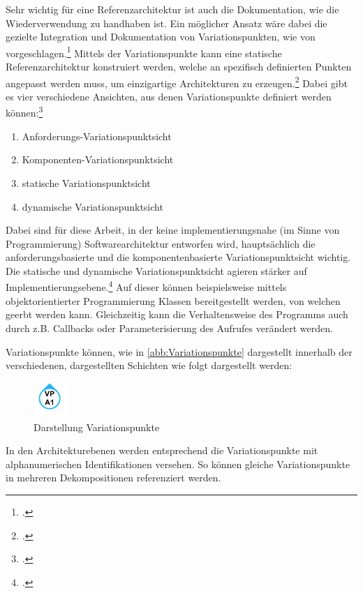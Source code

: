 Sehr wichtig für eine Referenzarchitektur ist auch die Dokumentation, wie die Wiederverwendung zu handhaben ist. Ein möglicher Ansatz wäre dabei die gezielte Integration und Dokumentation von Variationspunkten, wie von \citeauthor{Webber.2001} vorgeschlagen.\footcite[Vgl.][24\psqq]{Webber.2001} Mittels der Variationspunkte kann eine statische Referenzarchitektur konstruiert werden, welche an spezifisch definierten Punkten angepasst werden muss, um einzigartige Architekturen zu erzeugen.\footcite[Vgl.][24]{Webber.2001} Dabei gibt es vier verschiedene Ansichten, aus denen Variationspunkte definiert werden können:\footcite[Vgl.][25\psq]{Webber.2001}
\begin{enumerate}
\item \label{view:first} Anforderungs-Variationspunktsicht 
\item \label{view:second} Komponenten-Variationspunktsicht 
\item \label{view:third} statische Variationspunktsicht 
\item \label{view:fourth} dynamische Variationspunktsicht
\end{enumerate}
Dabei sind für diese Arbeit, in der keine implementierungsnahe (im Sinne von Programmierung) Softwarearchitektur entworfen wird, hauptsächlich die anforderungsbasierte und die komponentenbasierte Variationspunktsicht wichtig. Die statische und dynamische Variationspunktsicht agieren stärker auf Implementierungsebene.\footcite[Vgl. auch im Folgenden][25\psq]{Webber.2001} Auf dieser können beispielsweise mittels objektorientierter Programmierung Klassen bereitgestellt werden, von welchen geerbt werden kann. Gleichzeitig kann die Verhaltensweise des Programms auch durch z.B. Callbacks oder Parameterisierung des Aufrufes verändert werden.


Variationspunkte können, wie in \autoref{abb:Variationspunkte} dargestellt innerhalb der verschiedenen, dargestellten Schichten wie folgt dargestellt werden:
\begin{figure}[H]
\centering
\includegraphics[height=1.33cm]{graphics/Variationpoints.pdf}
\caption{Darstellung Variationspunkte}
\label{abb:Variationspunkte}
\end{figure}
In den Architekturebenen werden entsprechend die Variationspunkte mit alphanumerischen Identifikationen versehen. So können gleiche Variationspunkte in mehreren Dekompositionen referenziert werden.


